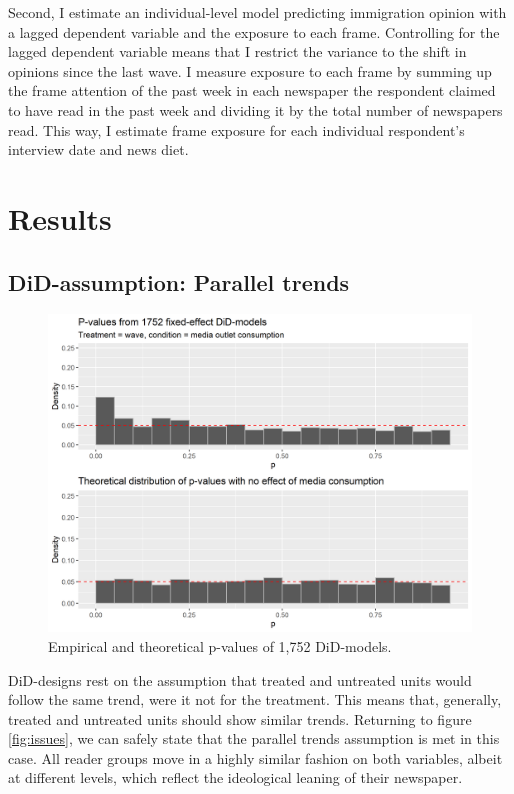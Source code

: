 \documentclass{article}
\begin{document}
Second, I estimate an individual-level model predicting immigration opinion with a lagged dependent variable and the exposure to each frame. Controlling for the lagged dependent variable means that I restrict the variance to the shift in opinions since the last wave. I measure exposure to each frame by summing up the frame attention of the past week in each newspaper the respondent claimed to have read in the past week and dividing it by the total number of newspapers read. This way, I estimate frame exposure for each individual respondent's interview date and news diet.


\section{Results}

\subsection{DiD-assumption: Parallel trends}

\begin{figure}[!ht]
    \centering
    \includegraphics[width=\textwidth]{paper/vis/DiD_model_ps.png}
    \caption{Empirical and theoretical p-values of 1,752 DiD-models.}
    \label{fig:p_values}
\end{figure}

DiD-designs rest on the assumption that treated and untreated units would follow the same trend, were it not for the treatment. This means that, generally, treated and untreated units should show similar trends. Returning to figure \ref{fig:issues}, we can safely state that the parallel trends assumption is met in this case. All reader groups move in a highly similar fashion on both variables, albeit at different levels, which reflect the ideological leaning of their newspaper.
\end{document}
